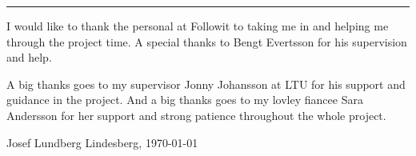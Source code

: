 \vspace{-10ex}%
\rule{\textwidth}{0.3pt}
\vspace{5ex}


I would like to thank the personal at Followit to taking me in and helping me through the project time. A special thanks to Bengt Evertsson for his supervision and help. 

A big thanks goes to my supervisor Jonny Johansson at LTU for his support and guidance in the project.
And a big thanks goes to my lovley fiancee Sara Andersson for her support and strong patience throughout the whole project. 

\begin{flushright}
Josef Lundberg
\newline
Lindesberg, \today
\end{flushright}

